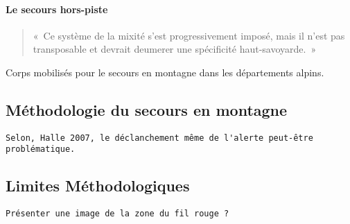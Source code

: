 \paragraph{Le secours hors-piste}



\begin{quotation}
  «~Ce système de la mixité s'est progressivement imposé, mais il
  n'est pas transposable et devrait deumerer une spécificité
  haut-savoyarde.~»
\end{quotation}

\begin{table}
  \centering
  
  \caption{Corps mobilisés pour le secours en montagne dans les
    départements alpins.}
  \label{tab:organisation_secours_departements}
\end{table}

\subsection{Méthodologie du secours en montagne}
\label{susec:1-1-2}

\begin{verbatim}
Selon, Halle 2007, le déclanchement même de l'alerte peut-être
problématique. 
\end{verbatim}

\subsection{Limites Méthodologiques}
\label{subsec:1-1-3}

\texttt{Présenter une image de la zone du fil rouge ?}

